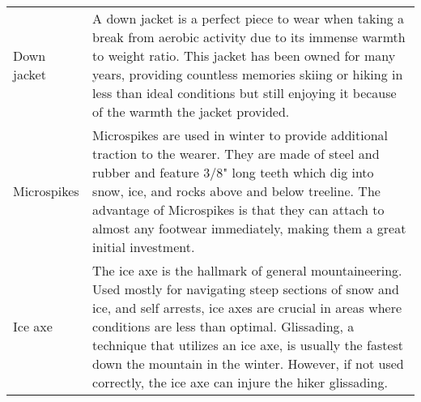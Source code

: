 \documentclass[11pt]{article}
\begin{document}
\begin{center}
\begin{longtable}{>{\raggedleft\arraybackslash}p{1in} >{\raggedright\arraybackslash}p{5.5in}}
		Down jacket & A down jacket is a perfect piece to wear when taking a break from aerobic activity due to its immense warmth to weight ratio. This jacket has been owned for many years, providing countless memories skiing or hiking in less than ideal conditions but still enjoying it because of the warmth the jacket provided.\\
		Microspikes & Microspikes are used in winter to provide additional traction to the wearer. They are made of steel and rubber and feature 3/8" long teeth which dig into snow, ice, and rocks above and below treeline. The advantage of Microspikes is that they can attach to almost any footwear immediately, making them a great initial investment.\\
		Ice axe & The ice axe is the hallmark of general mountaineering. Used mostly for navigating steep sections of snow and ice, and self arrests, ice axes are crucial in areas where conditions are less than optimal. Glissading, a technique that utilizes an ice axe, is usually the fastest down the mountain in the winter. However, if not used correctly, the ice axe can injure the hiker glissading.\\
	\end{longtable}
\end{center}
\end{document}
